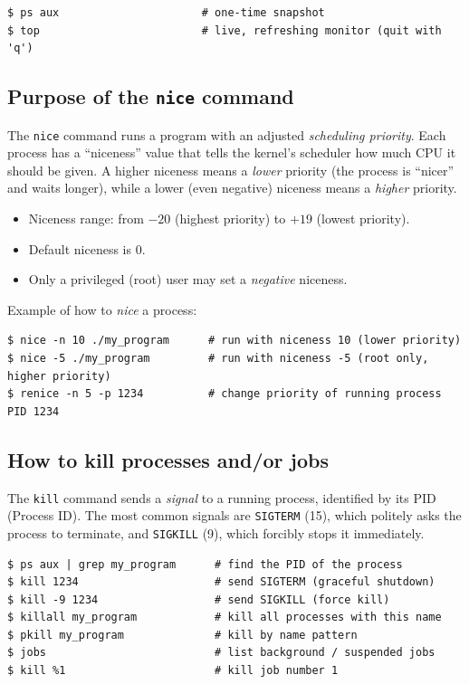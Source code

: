 \documentclass[11pt,a4paper]{article}
\begin{document}
\bigskip

\begin{lstlisting}[style=bashstyle]
$ ps aux                      # one-time snapshot
$ top                         # live, refreshing monitor (quit with 'q')
\end{lstlisting}

\subsection{Purpose of the \texttt{nice} command}

The \texttt{nice} command runs a program with an adjusted \emph{scheduling priority}. Each
process has a ``niceness'' value that tells the kernel's scheduler how much CPU it should be
given. A higher niceness means a \emph{lower} priority (the process is ``nicer'' and waits
longer), while a lower (even negative) niceness means a \emph{higher} priority.

\begin{itemize}[leftmargin=2em]
  \item Niceness range: from $-20$ (highest priority) to $+19$ (lowest priority).
  \item Default niceness is $0$.
  \item Only a privileged (root) user may set a \emph{negative} niceness.
\end{itemize}

Example of how to \emph{nice} a process:

\begin{lstlisting}[style=bashstyle]
$ nice -n 10 ./my_program      # run with niceness 10 (lower priority)
$ nice -5 ./my_program         # run with niceness -5 (root only, higher priority)
$ renice -n 5 -p 1234          # change priority of running process PID 1234
\end{lstlisting}

\subsection{How to kill processes and/or jobs}

The \texttt{kill} command sends a \emph{signal} to a running process, identified by its PID
(Process ID). The most common signals are \texttt{SIGTERM} (15), which politely asks the
process to terminate, and \texttt{SIGKILL} (9), which forcibly stops it immediately.

\begin{lstlisting}[style=bashstyle]
$ ps aux | grep my_program      # find the PID of the process
$ kill 1234                     # send SIGTERM (graceful shutdown)
$ kill -9 1234                  # send SIGKILL (force kill)
$ killall my_program            # kill all processes with this name
$ pkill my_program              # kill by name pattern
$ jobs                          # list background / suspended jobs
$ kill %1                       # kill job number 1
\end{lstlisting}
\end{document}

